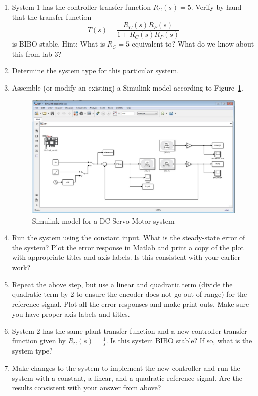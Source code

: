 \begin{enumerate}
\item System 1 has the controller transfer function $R_{C}(s)=5$\@.
Verify by hand that the transfer function
\begin{equation*}
T(s)= \frac{R_{C}(s)R_{P}(s)}{1+R_{C}(s)R_{P}(s)}
\end{equation*}
is BIBO stable. Hint: What is $R_{C} = 5$ equivalent to? What do we know about this from lab 3?

\item Determine the system type for this particular system.

\item Assemble (or modify an existing) a \textsf{Simulink} model according to
Figure~\ref{fig:model7a}\@.
\begin{figure}[htbp]
\centering
\includegraphics[width=0.6\hsize]{pix/performanceSpecificationModel4.jpg}
\caption{\textsf{Simulink} model for a DC Servo Motor
system}\label{fig:model7a}
\end{figure}%

\item Run the system using the constant input.  What is the steady-state
error of the system?  Plot the error response in \textsf{Matlab} and print a
copy of the plot with appropriate titles and axis labels. Is this consistent
with your earlier work?

\item Repeat the above step, but use a linear and quadratic term (divide the quadratic term by 2 to ensure the encoder does not go out of range) for the
reference signal.  Plot all the error responses and make print outs.  Make
sure you have proper axis labels and titles.

\item System 2 has the same plant transfer function and a new
controller transfer function given by $R_{C}(s)=\frac{1}{s}$\@.  Is this
system BIBO stable?  If so, what is the system type?

\item Make changes to the system to implement the new controller and run the
system with a constant, a linear, and a quadratic reference signal.  Are the
results consistent with your answer from above?


\end{enumerate}
